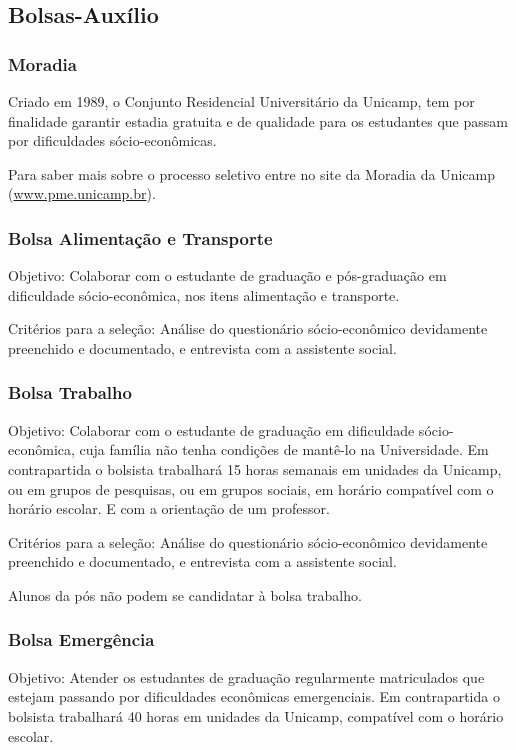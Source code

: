 \subsection{Bolsas-Auxílio}
\subsubsection*{Moradia}

Criado em 1989, o Conjunto Residencial Universitário da Unicamp, tem por
finalidade garantir estadia gratuita e de qualidade para os estudantes que
passam por dificuldades sócio-econômicas.

Para saber mais sobre o processo seletivo entre no site da Moradia da Unicamp
(\url{www.pme.unicamp.br}).

\subsubsection*{Bolsa Alimentação e Transporte}

Objetivo: Colaborar com o estudante de graduação e pós-graduação em dificuldade
sócio-econômica, nos itens alimentação e transporte.

Critérios para a seleção: Análise do questionário sócio-econômico devidamente
preenchido e documentado, e entrevista com a assistente social.

\subsubsection*{Bolsa Trabalho}

Objetivo: Colaborar com o estudante de graduação em dificuldade sócio-econômica,
cuja família não tenha condições de mantê-lo na Universidade. Em contrapartida o
bolsista trabalhará 15 horas semanais em unidades da Unicamp, ou em grupos de
pesquisas, ou em grupos sociais, em horário compatível com o horário escolar.  E
com a orientação de um professor.

Critérios para a seleção: Análise do questionário sócio-econômico devidamente
preenchido e documentado, e entrevista com a assistente social.

Alunos da pós não podem se candidatar à bolsa trabalho.

\subsubsection*{Bolsa Emergência}

Objetivo: Atender os estudantes de graduação regularmente matriculados que
estejam passando por dificuldades econômicas emergenciais. Em contrapartida o
bolsista trabalhará 40 horas em unidades da Unicamp, compatível com o horário
escolar.

